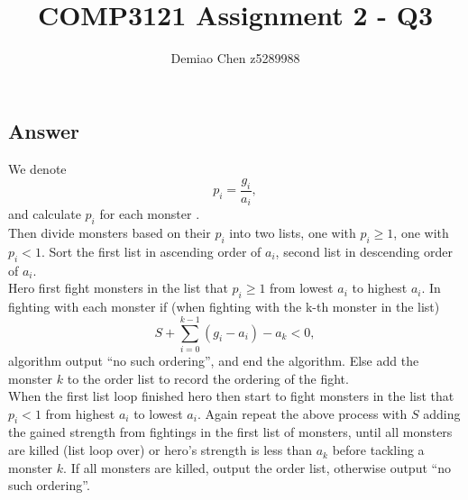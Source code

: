 \documentclass[12pt]{article}
\title{COMP3121 Assignment 2 - Q3}
\author{Demiao Chen z5289988}
\begin{document}
\maketitle
{}

\subsection*{Answer}
We denote $$p_i = \frac{g_i}{a_i},$$ and calculate $p_i$ for each monster .\\
Then divide monsters based on their $p_i$ into two lists, one with $p_i \geq 1$, one with 
$p_i <1 .$ Sort the first list in ascending order of $a_i$, second list in descending order
of $a_i$.\\ 
Hero first fight monsters in the list that $p_i \geq 1$ from lowest $a_i$ to highest 
$a_i$. In fighting with each monster if (when fighting with the k-th monster in the list) 
$$S + \sum_{i = 0}^{k-1}{(g_i-a_i)} - a_k < 0 ,$$ algorithm
output “no such ordering”, and end the algorithm. Else add the monster $k$ to the order list to 
record the ordering of the fight.
\\ When the first list loop finished hero then start to fight monsters in the list that $p_i <1$
from highest $a_i$ to lowest $a_i$. Again repeat the above process with $S$ adding the gained 
strength from fightings in the first list of monsters, until all monsters are 
killed (list loop over) or hero's strength is less than $a_k$ before tackling a monster $k$. If all monsters are killed,
output the order list, otherwise output “no such ordering”.
\end{document}
